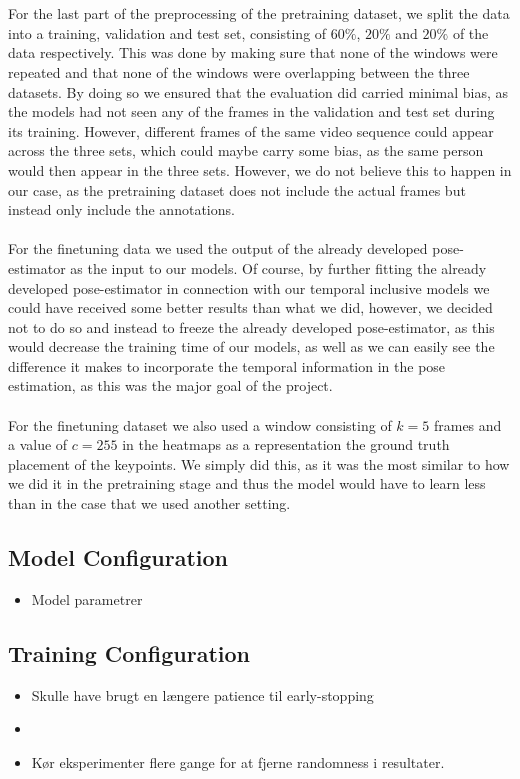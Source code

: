 \documentclass[./main.tex]{subfiles}
\begin{document}
\\
\\
For the last part of the preprocessing of the pretraining dataset, we split the data into a training, validation and test set, consisting of $60\%$, $20\%$ and $20\%$ of the data respectively. This was done by making sure that none of the windows were repeated and that none of the windows were overlapping between the three datasets. By doing so we ensured that the evaluation did carried minimal bias, as the models had not seen any of the frames in the validation and test set during its training. However, different frames of the same video sequence could appear across the three sets, which could maybe carry some bias, as the same person would then appear in the three sets. However, we do not believe this to happen in our case, as the pretraining dataset does not include the actual frames but instead only include the annotations.
\\
\\
For the finetuning data we used the output of the already developed pose-estimator as the input to our models. Of course, by further fitting the already developed pose-estimator in connection with our temporal inclusive models we could have received some better results than what we did, however, we decided not to do so and instead to freeze the already developed pose-estimator, as this would decrease the training time of our models, as well as we can easily see the difference it makes to incorporate the temporal information in the pose estimation, as this was the major goal of the project.
\\
\\
For the finetuning dataset we also used a window consisting of $k = 5$ frames and a value of $c = 255$ in the heatmaps as a representation the ground truth placement of the keypoints. We simply did this, as it was the most similar to how we did it in the pretraining stage and thus the model would have to learn less than in the case that we used another setting.

\subsection{Model Configuration}
\begin{itemize}
    \item Model parametrer
\end{itemize}

\subsection{Training Configuration}
\begin{itemize}
    \item Skulle have brugt en længere patience til early-stopping
    \item \item Kør eksperimenter flere gange for at fjerne randomness i resultater.
\end{itemize}
\end{document}
